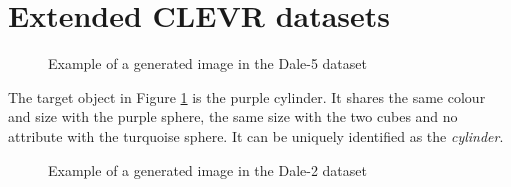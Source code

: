 \documentclass[11pt]{article}
\begin{document}
\section{Extended CLEVR datasets}
\label{sec:extended-datasets}
\begin{figure}[h]
  \centering
  \caption{Example of a generated image in the Dale-5 dataset}
  \label{fig:clevr-dale-5}
\end{figure}
The target object in Figure \ref{fig:clevr-dale-5} is the purple cylinder. It shares the same colour and size with the purple sphere, the same size with the two cubes and no attribute with the turquoise sphere. It can be uniquely identified as the \emph{cylinder}.

\begin{figure}[h]
  \centering
  \caption{Example of a generated image in the Dale-2 dataset}
  \label{fig:clevr-dale-2}
\end{figure}
\end{document}
